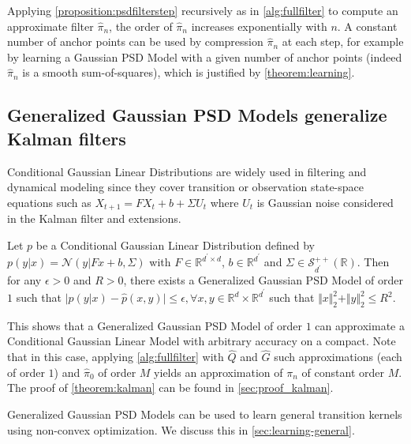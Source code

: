 Applying \cref{proposition:psdfilterstep} recursively as in \cref{alg:fullfilter} to compute an approximate filter $\hat \pi_n$, the order of $\hat\pi_n$ increases exponentially with $n$. A constant number of anchor points can be used by compression $\hat\pi_n$ at each step, for example by learning a Gaussian PSD Model with a given number of anchor points (indeed $\hat\pi_n$ is a smooth sum-of-squares), which is justified by \cref{theorem:learning}.

\subsection{Generalized Gaussian PSD Models generalize Kalman filters}

Conditional Gaussian Linear Distributions are widely used in filtering and dynamical modeling since they cover transition or observation state-space equations such as $X_{t+1} = FX_t + b + \Sigma U_t$ where $U_t$ is Gaussian noise considered in the Kalman filter and extensions.

\begin{theorem}\label{theorem:kalman}
Let $p$ be a Conditional Gaussian Linear Distribution defined by $p(y | x) = \mathcal N(y | Fx + b, \Sigma)$ with $F\in\mathbb R^{d ^\prime\times d}$, $b\in\mathbb R^{d^\prime}$ and $\Sigma\in\mathcal S^{++}_{d^\prime}(\mathbb R)$. Then for any $\epsilon>0$ and $R>0$, there exists a Generalized Gaussian PSD Model of order $1$ such that $\vert p(y | x) - \hat p(x, y) \vert \leq \epsilon, $$\forall x, y \in \mathbb R^d \times \mathbb R^{d^\prime}$ such that $\Vert x\Vert_2^2 + \Vert y \Vert_2^2 \leq R^2$.
\end{theorem}

This shows that a Generalized Gaussian PSD Model of order $1$ can approximate a Conditional Gaussian Linear Model with arbitrary accuracy on a compact. Note that in this case, applying \cref{alg:fullfilter} with $\hat Q$ and $\hat G$ such approximations (each of order $1$) and $\hat\pi_0$ of order $M$ yields an approximation of $\pi_n$ of constant order $M$. The proof of \cref{theorem:kalman} can be found in \cref{sec:proof_kalman}.

Generalized Gaussian PSD Models can be used to learn general transition kernels using non-convex optimization. We discuss this in \cref{sec:learning-general}.
